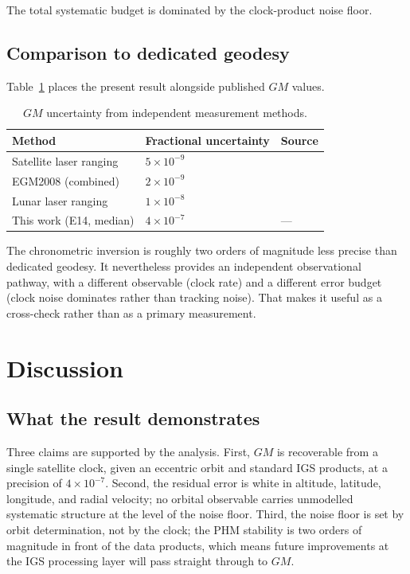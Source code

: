 \documentclass[11pt,a4paper]{article}
\begin{document}
The total systematic budget is dominated by the clock-product noise floor.

\subsection{Comparison to dedicated geodesy}

Table~\ref{tab:compare} places the present result alongside published $GM$ values.

\begin{table}[h]
    \centering
    \caption{$GM$ uncertainty from independent measurement methods.}
    \label{tab:compare}
    \begin{tabular}{lll}
        \toprule
        Method & Fractional uncertainty & Source \\
        \midrule
        Satellite laser ranging & $5 \times 10^{-9}$ & \citet{Ries2016} \\
        EGM2008 (combined) & $2 \times 10^{-9}$ & \citet{Pavlis2012} \\
        Lunar laser ranging & $1 \times 10^{-8}$ & \citet{Williams2014} \\
        This work (E14, median) & $4 \times 10^{-7}$ & --- \\
        \bottomrule
    \end{tabular}
\end{table}

The chronometric inversion is roughly two orders of magnitude less precise than dedicated geodesy. It nevertheless provides an independent observational pathway, with a different observable (clock rate) and a different error budget (clock noise dominates rather than tracking noise). That makes it useful as a cross-check rather than as a primary measurement.

\section{Discussion}

\subsection{What the result demonstrates}

Three claims are supported by the analysis. First, $GM$ is recoverable from a single satellite clock, given an eccentric orbit and standard IGS products, at a precision of $4 \times 10^{-7}$. Second, the residual error is white in altitude, latitude, longitude, and radial velocity; no orbital observable carries unmodelled systematic structure at the level of the noise floor. Third, the noise floor is set by orbit determination, not by the clock; the PHM stability is two orders of magnitude in front of the data products, which means future improvements at the IGS processing layer will pass straight through to $GM$.
\end{document}
